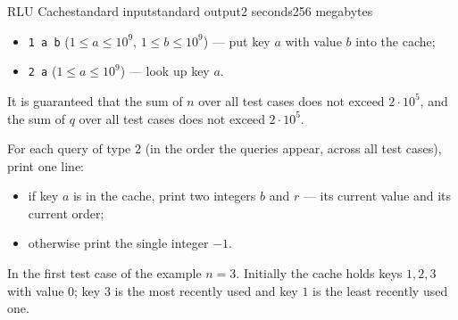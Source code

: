 \begin{problem}{RLU Cache}{standard input}{standard output}{2 seconds}{256 megabytes}
\begin{itemize}
  \item \texttt{1 a b} ($1 \le a \le 10^9$, $1 \le b \le 10^9$) --- put key $a$ with value $b$ into the cache;
  \item \texttt{2 a} ($1 \le a \le 10^9$) --- look up key $a$.
\end{itemize}

It is guaranteed that the sum of $n$ over all test cases does not exceed $2 \cdot 10^5$, and the sum of $q$ over all test cases does not exceed $2 \cdot 10^5$.


\OutputFile
For each query of type $2$ (in the order the queries appear, across all test cases), print one line:

\begin{itemize}
  \item if key $a$ is in the cache, print two integers $b$ and $r$ --- its current value and its current order;
  \item otherwise print the single integer $-1$.
\end{itemize}


\Example

\begin{example}
%
\end{example}

\Note
In the first test case of the example $n = 3$. Initially the cache holds keys $1, 2, 3$ with value $0$; key $3$ is the most recently used and key $1$ is the least recently used one.


\end{problem}
